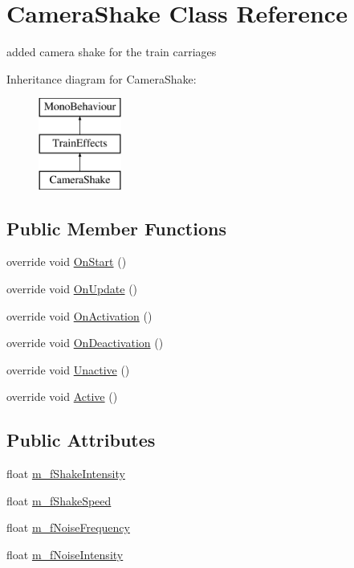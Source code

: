 \hypertarget{class_camera_shake}{}\section{Camera\+Shake Class Reference}
\label{class_camera_shake}


added camera shake for the train carriages  


Inheritance diagram for Camera\+Shake\+:\begin{figure}[H]
\begin{center}
\leavevmode
\includegraphics[height=3.000000cm]{class_camera_shake}
\end{center}
\end{figure}
\subsection*{Public Member Functions}
\begin{DoxyCompactItemize}
\item 
override void \mbox{\hyperlink{class_camera_shake_a564408e38a410303c26ea371f9474496}{On\+Start}} ()
\item 
override void \mbox{\hyperlink{class_camera_shake_a4bc10cdc460936d634078c39db1aed3b}{On\+Update}} ()
\item 
override void \mbox{\hyperlink{class_camera_shake_a255a08f5518a42755e063a35ffe2523f}{On\+Activation}} ()
\item 
override void \mbox{\hyperlink{class_camera_shake_a23f08ebfe2391c0f361e2944599c8bfa}{On\+Deactivation}} ()
\item 
override void \mbox{\hyperlink{class_camera_shake_ac7c118994512130c10ff57af288fe43e}{Unactive}} ()
\item 
override void \mbox{\hyperlink{class_camera_shake_a386499c12399f010723509525fd0fae0}{Active}} ()
\end{DoxyCompactItemize}
\subsection*{Public Attributes}
\begin{DoxyCompactItemize}
\item 
float \mbox{\hyperlink{class_camera_shake_af3e9f7de3c037153193e0dd99309dd1c}{m\+\_\+f\+Shake\+Intensity}}
\item 
float \mbox{\hyperlink{class_camera_shake_a8a71e58f4b23e0a644b05f1fe4ae6bc8}{m\+\_\+f\+Shake\+Speed}}
\item 
float \mbox{\hyperlink{class_camera_shake_a69bceb25e43a423052df30cda3b189aa}{m\+\_\+f\+Noise\+Frequency}}
\item 
float \mbox{\hyperlink{class_camera_shake_a2f459bdffabca04043f698bd4b3b124c}{m\+\_\+f\+Noise\+Intensity}}
\end{DoxyCompactItemize}
